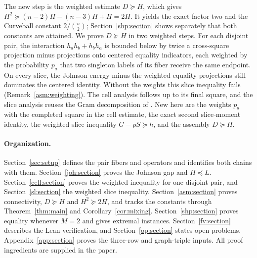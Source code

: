 The new step is the weighted estimate $D\succeq H$, which gives
$H^2\succeq(n-2)H-(n-3)H+H=2H$. It yields the exact factor two and the
Curveball constant $2/\binom n2$; Section~\ref{shp:section} shows separately
that both constants are attained. We prove $D\succeq H$ in two weighted
steps. For each disjoint pair, the interaction $h_ah_b+h_bh_a$ is
bounded below by twice a cross-square projection minus projections onto
centered equality indicators, each weighted by the probability $p_a$ that two
singleton labels of its fiber receive the same endpoint. On every slice, the
Johnson energy minus the weighted equality projections still dominates the
centered identity. Without the weights this slice inequality fails
(Remark~\ref{asm:weighting}). The cell analysis follows
\cite[Proposition~5.1]{OAI26} up to its final square, and the slice analysis
reuses the Gram decomposition of \cite[Lemma~6.1]{OAI26}. New here are the
weights $p_a$ with the completed square in the cell estimate, the exact
second slice-moment identity, the weighted slice inequality $G-pS\succeq h$,
and the assembly $D\succeq H$.

\paragraph{Organization.}
Section~\ref{sec:setup} defines the pair fibers and operators and identifies
both chains with them. Section~\ref{joh:section} proves the Johnson gap and
$H\preceq L$. Section~\ref{cell:section} proves the weighted inequality for
one disjoint pair, and Section~\ref{sl:section} the weighted slice
inequality. Section~\ref{asm:section} proves connectivity, $D\succeq H$ and
$H^2\succeq2H$, and tracks the constants through Theorem~\ref{thm:main} and
Corollary~\ref{cor:mixing}. Section~\ref{shp:section} proves equality
whenever $M=2$ and gives extremal instances. Section~\ref{fv:section} describes the Lean verification, and
Section~\ref{op:section} states open problems. Appendix~\ref{app:section}
proves the three-row and graph-triple inputs. All proof ingredients are
supplied in the paper.
